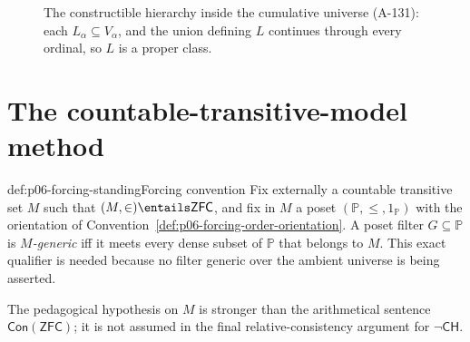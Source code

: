 \begin{figure}[htbp]
\centering
{}
\caption{The constructible hierarchy inside the cumulative universe (A-131):
each \(L_\alpha\subseteq V_\alpha\), and the union defining \(L\) continues
through every ordinal, so \(L\) is a proper class.}
\label{fig:p06-constructible-hierarchy}
\end{figure}

\section{The countable-transitive-model method}
\label{sec:p06-ctm-forcing}

\begin{hbconvention}{def:p06-forcing-standing}{Forcing convention}
Fix externally a countable transitive set \(M\) such that
\((M,\in)\entails\mathsf{ZFC}\), and fix in \(M\) a poset
\((\mathbb P,\leq,1_{\mathbb P})\) with the orientation of
Convention~\ref{def:p06-forcing-order-orientation}.  A poset filter
\(G\subseteq\mathbb P\) is \emph{\(M\)-generic} iff it meets every dense
subset of \(\mathbb P\) that belongs to \(M\).  This exact qualifier is needed
because no filter generic over the ambient universe is being asserted.

The pedagogical hypothesis on \(M\) is stronger than
the arithmetical sentence \(\mathsf{Con}(\mathsf{ZFC})\); it is not assumed in
the final relative-consistency argument for \(\neg\mathsf{CH}\).
\end{hbconvention}

